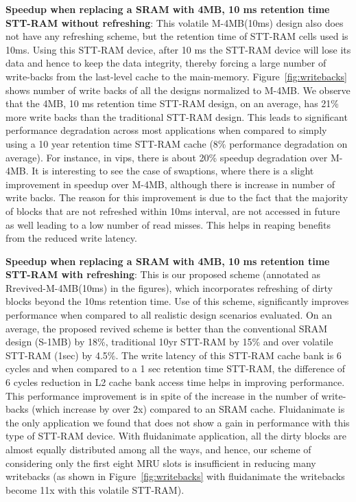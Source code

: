 {\bf Speedup when replacing a SRAM with 4MB, 10 ms retention time STT-RAM without refreshing}: This volatile M-4MB(10ms) design also does not have any refreshing scheme, but the retention time of STT-RAM cells used is 10ms. Using this STT-RAM device, after 10 ms the STT-RAM device will lose its data and hence to keep the data integrity, thereby forcing a large number of write-backs from the last-level cache to the main-memory. Figure~\ref{fig:writebacks} shows number of write backs of all the designs normalized to M-4MB. We observe that the 4MB, 10 ms retention time STT-RAM design, on an average, has 21\% more write backs than the traditional STT-RAM design.
This leads to significant performance degradation across most applications when compared to simply using a 10 year retention time STT-RAM cache (8\% performance degradation on average). For instance, in vips, there is about 20\% speedup
degradation over M-4MB. It is interesting to see the case of swaptions, where there is a slight improvement in speedup over M-4MB, although
there is increase in number of write backs. The reason for this improvement is due to the fact that the majority of blocks that are not refreshed within 10ms interval, are not accessed in future as well leading to a low number of read misses. This helps in reaping benefits from the reduced write latency.

{\bf Speedup when replacing a SRAM with 4MB, 10 ms retention time STT-RAM with refreshing}: This is our proposed scheme (annotated as Rrevived-M-4MB(10ms) in the figures), which incorporates refreshing of dirty blocks beyond the 10ms retention time.
Use of this scheme, significantly improves performance when compared to all realistic design scenarios evaluated. On an average, the proposed revived scheme is better than the conventional SRAM design (S-1MB) by 18\%, traditional 10yr STT-RAM by 15\% and over volatile STT-RAM (1sec)
by 4.5\%. The write latency of this STT-RAM cache bank is 6 cycles and when compared to a 1 sec retention time STT-RAM, the difference of 6 cycles reduction in L2 cache bank access time helps in improving performance. This performance improvement is in spite of the increase in the number of write-backs (which increase by over 2x) compared to an SRAM cache. Fluidanimate is the only application we found that does not show a gain in performance with this type of STT-RAM device. With fluidanimate application, all the dirty blocks are almost equally distributed among all the ways, and hence, our scheme of considering only the first eight MRU slots is insufficient in reducing many writebacks (as shown in Figure~\ref{fig:writebacks} with fluidanimate the writebacks become 11x with this volatile STT-RAM).

